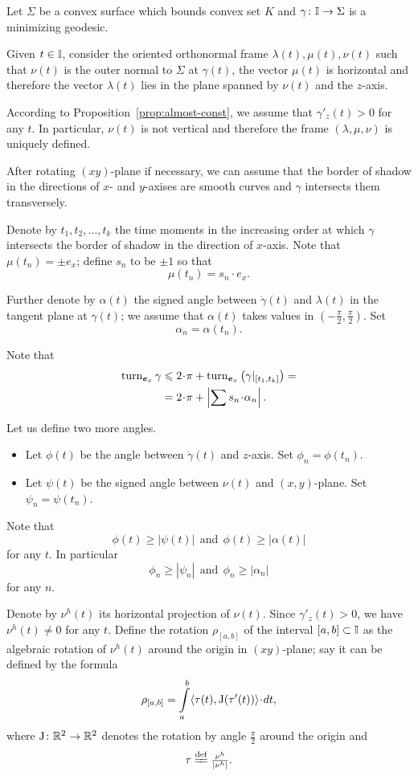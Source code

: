 \documentclass[a4paper,10pt]{amsart}
\begin{document}
Let $\Sigma$ be a convex surface which bounds convex set $K$
and $\gamma\colon\mathbb{I}\to \Sigma$ is a minimizing geodesic.

Given $t\in \mathbb{I}$, 
consider the oriented orthonormal frame $\lambda(t),\mu(t),\nu(t)$ 
such that $\nu(t)$ is the outer normal to $\Sigma$ at $\gamma(t)$,
the vector $\mu(t)$ is horizontal and therefore the vector $\lambda(t)$ lies in the plane spanned by $\nu(t)$ and the $z$-axis.

According to Proposition~\ref{prop:almost-const},
 we assume that $\gamma'_z(t)>0$ for any $t$.
In particular, $\nu(t)$ is not vertical and therefore
the frame $(\lambda,\mu,\nu)$ is uniquely defined.

After rotating $(xy)$-plane if necessary, 
we can assume that the border of shadow in the directions of $x$- and $y$-axises 
are smooth curves and $\gamma$ intersects them transversely.

Denote by $t_1,t_2,\dots, t_k$ the time moments in the increasing order 
at which $\gamma$ intersects 
the border of shadow in the direction of $x$-axis.
Note that $\mu(t_n)=\pm e_x$;
define $s_n$ to be $\pm1$ so that
\[\mu(t_n)=s_n\cdot e_x.\]

Further denote by $\alpha(t)$ the signed angle between $\dot\gamma(t)$ and $\lambda(t)$ in the tangent plane at $\gamma(t)$;
we assume that $\alpha(t)$ takes values in $(-\tfrac\pi2,\tfrac\pi2)$.
Set 
\[\alpha_n=\alpha(t_n).\]

Note that  
\begin{align*}
\turn_{\bm{e}_x} \gamma
&\le 
2\cdot\pi+\turn_{\bm{e}_x}\left(\gamma|_{[t_1,t_k]}\right)=
\\
&=2\cdot\pi+\left|\sum s_n\cdot \alpha_n\right|.
\end{align*}

Let us define two more angles.
\begin{itemize}
\item Let $\phi(t)$ be the angle between $\dot\gamma(t)$ and $z$-axis. Set $\phi_n=\phi(t_n)$.
\item Let $\psi(t)$ be the signed angle between $\nu(t)$ and $(x,y)$-plane. 
Set $\psi_n=\psi(t_n)$.
\end{itemize}
Note that 
\[\phi(t)\ge |\psi(t)|\ \ \text{and}\ \  \phi(t)\ge |\alpha(t)|\] 
for any $t$.
In particular 
\[\phi_n\ge |\psi_n|\ \ \text{and}\ \  \phi_n\ge |\alpha_n|\]
for any $n$.

Denote by $\nu^h(t)$ its horizontal projection of $\nu(t)$.
Since $\gamma'_z(t)>0$, 
we have $\nu^h(t)\ne0$ for any $t$.
Define the rotation $\rho_{[a,b]}$  
of the interval $[a,b]\subset\mathbb{I}$
as the
algebraic rotation of $\nu^h(t)$ around the origin in $(xy)$-plane;
say it can be defined by the formula 
\[\rho_{[a,b]}
=
\int\limits_a^b \<\tau(t),\mathrm{J}(\tau'(t))\>\cdot dt,\]
where $\mathrm{J}\colon\mathbb{R}^2\to\mathbb{R}^2$ denotes the rotation by angle $\tfrac\pi 2$ around the origin and \[\tau\df\tfrac{\nu^h}{|\nu^h|}.\]
\end{document}
